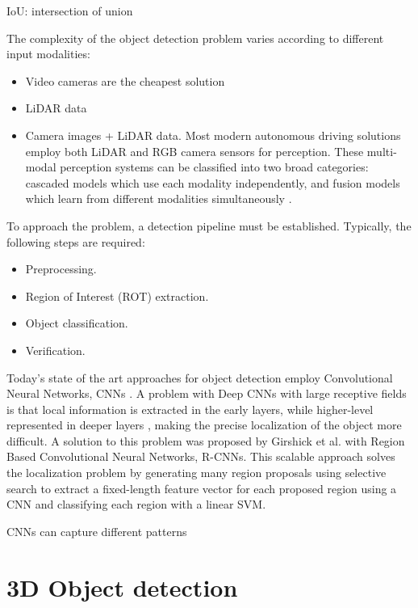 IoU: intersection of union

The complexity of the object detection problem varies according to different input modalities:
\begin{itemize}
    \item Video cameras are the cheapest solution
    \item LiDAR data 
    \item Camera images + LiDAR data. Most modern autonomous driving solutions employ both LiDAR and RGB camera sensors for perception. These multi-modal perception systems can be classified into two broad categories: cascaded models which use each modality independently, and fusion models which learn from different modalities simultaneously \cite{DBLP:conf/iros/AbdelfattahY0W21}.
\end{itemize}

To approach the problem, a detection pipeline must be established. Typically, the following steps are required:
\begin{itemize}
    \item Preprocessing.
    \item Region of Interest (ROT) extraction.
    \item Object classification.
    \item Verification.
\end{itemize}


Today's state of the art approaches for object detection employ Convolutional Neural Networks, CNNs \cite{DBLP:conf/eccv/CaiFFV16} \cite{DBLP:journals/pami/ChenKZMFU18}.
A problem with Deep CNNs with large receptive fields is that local information is extracted in the early layers, while higher-level represented in deeper layers \cite{DBLP:journals/ftcgv/JanaiGBG20}, making the precise localization of the object more difficult.
A solution to this problem was proposed by Girshick et al. \cite{DBLP:conf/cvpr/GirshickDDM14} with Region Based Convolutional Neural Networks, R-CNNs. This scalable approach solves the localization problem by generating many region proposals using selective search \cite{DBLP:journals/ijcv/UijlingsSGS13} to extract a fixed-length feature vector for each proposed region using a CNN and classifying each region with a linear SVM.




CNNs can capture different patterns 


\newpage
\section{3D Object detection}

